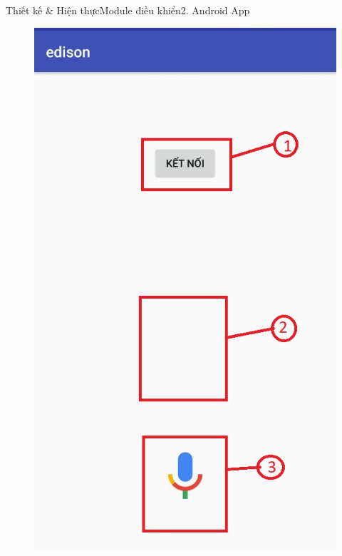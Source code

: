 \documentclass[compress, blue, 13pt,hyperref={pdfpagemode=FullScreen}]{beamer}
\begin{document}
\begin{frame}{Thiết kế \& Hiện thực}{Module điều khiển}{2. Android App}
\begin{figure}[hbtp]
\centering
\includegraphics[scale=0.22]{images/1528618723907.JPEG}

\end{figure}
\end{frame}
\end{document}
